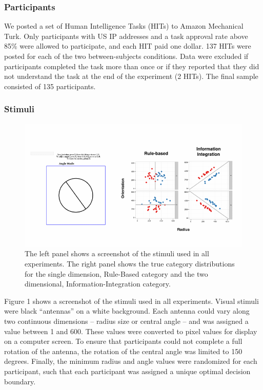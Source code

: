\documentclass[10pt, letterpaper]{article}
\newenvironment{CodeChunk}{}{}
\begin{document}
\subsubsection{Participants}\label{participants}

We posted a set of Human Intelligence Tasks (HITs) to Amazon Mechanical
Turk. Only participants with US IP addresses and a task approval rate
above 85\% were allowed to participate, and each HIT paid one dollar.
137 HITs were posted for each of the two between-subjects conditions.
Data were excluded if participants completed the task more than once or
if they reported that they did not understand the task at the end of the
experiment (2 HITs). The final sample consisted of 135 participants.

\subsubsection{Stimuli}\label{stimuli}

\begin{CodeChunk}
\captionsetup{width=0.8\textwidth}\begin{figure}[h]

{\centering \includegraphics{figs/stimuli-1} 

}

\caption[The left panel shows a screenshot of the stimuli used in all experiments]{The left panel shows a screenshot of the stimuli used in all experiments. The right panel shows the true category distributions for the single dimension, Rule-Based category and the two dimensional, Information-Integration category.}\label{fig:stimuli}
\end{figure}
\end{CodeChunk}

Figure 1 shows a screenshot of the stimuli used in all experiments.
Visual stimuli were black ``antennas'' on a white background. Each
antenna could vary along two continuous dimensions -- radius size or
central angle -- and was assigned a value between 1 and 600. These
values were converted to pixel values for display on a computer screen.
To ensure that participants could not complete a full rotation of the
antenna, the rotation of the central angle was limited to 150 degrees.
Finally, the minimum radius and angle values were randomized for each
participant, such that each participant was assigned a unique optimal
decision boundary.
\end{document}
